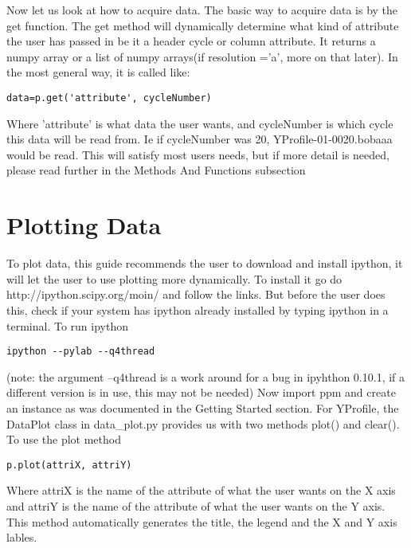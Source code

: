 Now let us look at how to acquire data.
\newline
The basic way to acquire data is by the get function. The get method will dynamically determine what kind of attribute the user has passed in
be it a header cycle or column attribute.  It returns a numpy array or a list of numpy arrays(if resolution ='a', more on that later).  In the most general way, it is called like:
\begin{verbatim}
data=p.get('attribute', cycleNumber)
\end{verbatim}
Where 'attribute' is what data the user wants, and cycleNumber is which cycle this data will be read from.  Ie if cycleNumber was 20, YProfile-01-0020.bobaaa would be read.
This will satisfy most users needs, but if more detail is needed, please read further in the Methods And Functions subsection

\section{Plotting Data}
To plot data, this guide recommends the user to download and install ipython, it will let the user to use plotting more dynamically. To install it go do http://ipython.scipy.org/moin/ and follow the links.
But before the user does this, check if your system has ipython already installed by typing ipython in a terminal.
\newline
To run ipython
\begin{verbatim}
ipython --pylab --q4thread
\end{verbatim}
(note: the argument --q4thread is a work around for a bug in ipyhthon 0.10.1, if a different version is in use, this may not be needed)
\newline
Now import ppm and create an instance as was documented in the Getting Started section.
For YProfile, the DataPlot class in  data\_plot.py provides us with two methods plot() and clear().
\newline
To use the plot method
\begin{verbatim}
p.plot(attriX, attriY)
\end{verbatim}
Where attriX is the name of the attribute of what the user wants on the X axis and attriY is the name of the attribute of what the user wants on the Y axis.
This method automatically generates the title, the legend and the X and Y axis lables.

